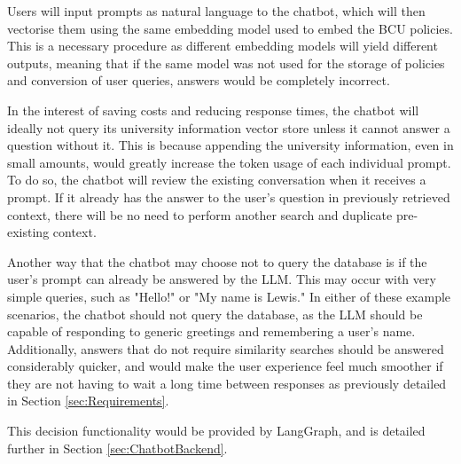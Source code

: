 \noindent Users will input prompts as natural language to the chatbot, which will then vectorise them using the same embedding model used 
to embed the BCU policies. This is a necessary procedure as different embedding models will yield different outputs, meaning that if the same 
model was not used for the storage of policies and conversion of user queries, answers would be completely incorrect. 

\para In the interest of saving costs and reducing response times, the chatbot will ideally not query its university information vector store 
unless it cannot answer a question without it. This is because appending the university information, even in small amounts, would 
greatly increase the token usage of each individual prompt. To do so, the chatbot will review the existing conversation when it receives a 
prompt. If it already has the answer to the user's question in previously retrieved context, there will be no need to perform another search 
and duplicate pre-existing context.

\para Another way that the chatbot may choose not to query the database is if the user's prompt can already be answered by the LLM. This may 
occur with very simple queries, such as "Hello!" or "My name is Lewis." In either of these example scenarios, the chatbot should not query the 
database, as the LLM should be capable of responding to generic greetings and remembering a user's name. Additionally, answers that do not 
require similarity searches should be answered considerably quicker, and would make the user experience feel much smoother if they are not 
having to wait a long time between responses as previously detailed in Section \ref{sec:Requirements}. 

\para This decision functionality would be provided by LangGraph, and is detailed 
further in Section \ref{sec:ChatbotBackend}.



